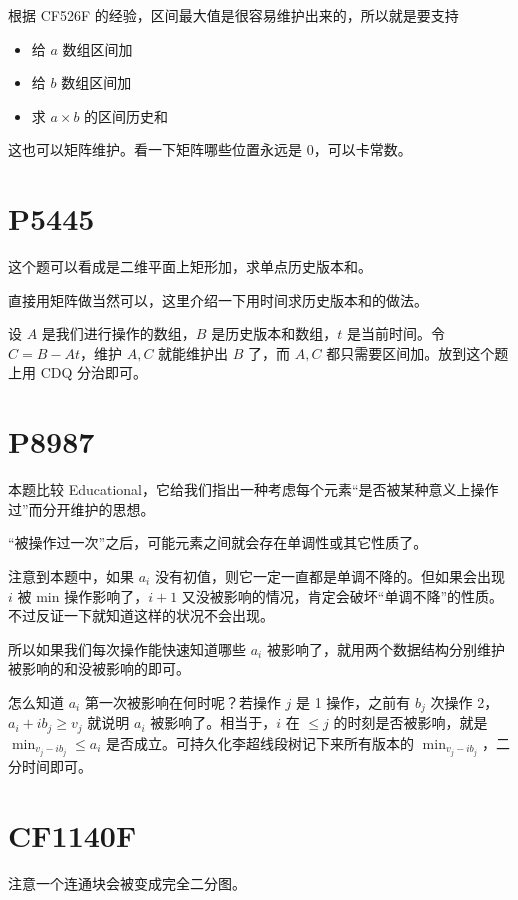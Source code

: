 \documentclass{noithesis}
\begin{document}
根据 CF526F 的经验，区间最大值是很容易维护出来的，所以就是要支持

\begin{itemize}
\item 给 $a$ 数组区间加
\item 给 $b$ 数组区间加
\item 求 $a\times b$ 的区间历史和
\end{itemize}

这也可以矩阵维护。看一下矩阵哪些位置永远是 0，可以卡常数。

\section{P5445}

这个题可以看成是二维平面上矩形加，求单点历史版本和。

直接用矩阵做当然可以，这里介绍一下用时间求历史版本和的做法。

设 $A$ 是我们进行操作的数组，$B$ 是历史版本和数组，$t$ 是当前时间。令 $C=B-At$，维护 $A,C$ 就能维护出 $B$ 了，而 $A,C$ 都只需要区间加。放到这个题上用 CDQ 分治即可。

\section{P8987}

本题比较 Educational，它给我们指出一种考虑每个元素“是否被某种意义上操作过”而分开维护的思想。

“被操作过一次”之后，可能元素之间就会存在单调性或其它性质了。

注意到本题中，如果 $a_i$ 没有初值，则它一定一直都是单调不降的。但如果会出现 $i$ 被 min 操作影响了，$i+1$ 又没被影响的情况，肯定会破坏“单调不降”的性质。不过反证一下就知道这样的状况不会出现。

所以如果我们每次操作能快速知道哪些 $a_i$ 被影响了，就用两个数据结构分别维护被影响的和没被影响的即可。

怎么知道 $a_i$ 第一次被影响在何时呢？若操作 $j$ 是 1 操作，之前有 $b_j$ 次操作 2，$a_i+ib_j\ge v_j$ 就说明 $a_i$ 被影响了。相当于，$i$ 在 $\le j$ 的时刻是否被影响，就是 $\min_{v_j-ib_j}\le a_i$ 是否成立。可持久化李超线段树记下来所有版本的 $\min_{v_j-ib_j}$，二分时间即可。

\section{CF1140F}

注意一个连通块会被变成完全二分图。
\end{document}
